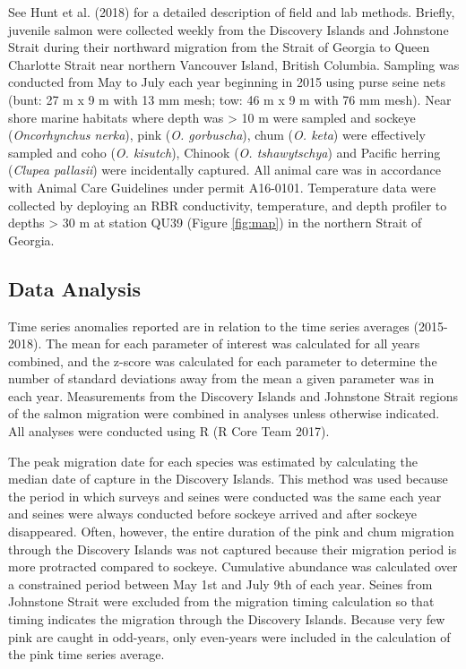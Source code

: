 \documentclass[fleqn,10pt]{wlpeerj} %
\begin{document}
See Hunt et al. (2018) for a detailed description of field and lab
methods. Briefly, juvenile salmon were collected weekly from the
Discovery Islands and Johnstone Strait during their northward migration
from the Strait of Georgia to Queen Charlotte Strait near northern
Vancouver Island, British Columbia. Sampling was conducted from May to
July each year beginning in 2015 using purse seine nets (bunt: 27 m x 9
m with 13 mm mesh; tow: 46 m x 9 m with 76 mm mesh). Near shore marine
habitats where depth was \textgreater{} 10 m were sampled and sockeye
(\emph{Oncorhynchus nerka}), pink (\emph{O. gorbuscha}), chum (\emph{O.
keta}) were effectively sampled and coho (\emph{O. kisutch}), Chinook
(\emph{O. tshawytschya}) and Pacific herring (\emph{Clupea pallasii})
were incidentally captured. All animal care was in accordance with
Animal Care Guidelines under permit A16-0101. Temperature data were
collected by deploying an RBR conductivity, temperature, and depth
profiler to depths \textgreater{} 30 m at station QU39 (Figure
\ref{fig:map}) in the northern Strait of Georgia.

\subsection{Data Analysis}\label{data-analysis}

Time series anomalies reported are in relation to the time series
averages (2015-2018). The mean for each parameter of interest was
calculated for all years combined, and the z-score was calculated for
each parameter to determine the number of standard deviations away from
the mean a given parameter was in each year. Measurements from the
Discovery Islands and Johnstone Strait regions of the salmon migration
were combined in analyses unless otherwise indicated. All analyses were
conducted using R (R Core Team 2017).

The peak migration date for each species was estimated by calculating
the median date of capture in the Discovery Islands. This method was
used because the period in which surveys and seines were conducted was
the same each year and seines were always conducted before sockeye
arrived and after sockeye disappeared. Often, however, the entire
duration of the pink and chum migration through the Discovery Islands
was not captured because their migration period is more protracted
compared to sockeye. Cumulative abundance was calculated over a
constrained period between May 1st and July 9th of each year. Seines
from Johnstone Strait were excluded from the migration timing
calculation so that timing indicates the migration through the Discovery
Islands. Because very few pink are caught in odd-years, only even-years
were included in the calculation of the pink time series average.
\end{document}
